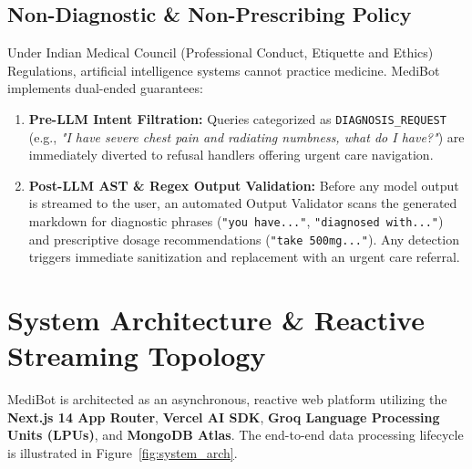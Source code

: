 \documentclass[11pt,a4paper]{article}
\begin{document}
\subsection{Non-Diagnostic \& Non-Prescribing Policy}
Under Indian Medical Council (Professional Conduct, Etiquette and Ethics) Regulations, artificial intelligence systems cannot practice medicine. MediBot implements dual-ended guarantees:
\begin{enumerate}
  \item \textbf{Pre-LLM Intent Filtration:} Queries categorized as \texttt{DIAGNOSIS\_REQUEST} (e.g., \textit{"I have severe chest pain and radiating numbness, what do I have?"}) are immediately diverted to refusal handlers offering urgent care navigation.
  \item \textbf{Post-LLM AST \& Regex Output Validation:} Before any model output is streamed to the user, an automated Output Validator scans the generated markdown for diagnostic phrases (\texttt{"you have..."}, \texttt{"diagnosed with..."}) and prescriptive dosage recommendations (\texttt{"take 500mg..."}). Any detection triggers immediate sanitization and replacement with an urgent care referral.
\end{enumerate}

\section{System Architecture \& Reactive Streaming Topology}

MediBot is architected as an asynchronous, reactive web platform utilizing the \textbf{Next.js 14 App Router}, \textbf{Vercel AI SDK}, \textbf{Groq Language Processing Units (LPUs)}, and \textbf{MongoDB Atlas}. The end-to-end data processing lifecycle is illustrated in Figure~\ref{fig:system_arch}.
\end{document}
